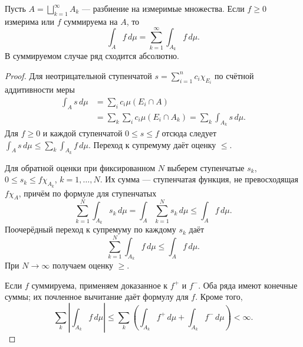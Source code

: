 \label{ticket:29}

\begin{theorem}
Пусть $A=\bigsqcup_{k=1}^{\infty}A_k$ --- разбиение на измеримые множества.
Если $f\ge0$ измерима или $f$ суммируема на $A$, то
\[
  \int_A f\,d\mu=\sum_{k=1}^{\infty}\int_{A_k}f\,d\mu.
\]
В суммируемом случае ряд сходится абсолютно.
\end{theorem}

\begin{proof}
Для неотрицательной ступенчатой $s=\sum_{i=1}^n c_i\chi_{E_i}$ по счётной аддитивности меры
\[
  \begin{aligned}
  \int_A s\,d\mu
   &=\sum_i c_i\mu(E_i\cap A)\\
   &=\sum_k\sum_i c_i\mu(E_i\cap A_k)
    =\sum_k\int_{A_k}s\,d\mu.
  \end{aligned}
\]
Для $f\ge0$ и каждой ступенчатой $0\le s\le f$ отсюда следует $\int_A s\,d\mu\le\sum_k\int_{A_k}f\,d\mu$.
Переход к супремуму даёт оценку $\le$.

Для обратной оценки при фиксированном $N$ выберем ступенчатые $s_k$, $0\le s_k\le f\chi_{A_k}$, $k=1,\ldots,N$.
Их сумма --- ступенчатая функция, не превосходящая $f\chi_A$, причём по формуле для ступенчатых
\[
  \sum_{k=1}^N\int_{A_k}s_k\,d\mu
  =\int_A\sum_{k=1}^N s_k\,d\mu\le\int_A f\,d\mu.
\]
Поочерёдный переход к супремуму по каждому $s_k$ даёт
\[
  \sum_{k=1}^N\int_{A_k}f\,d\mu\le\int_A f\,d\mu.
\]
При $N\to\infty$ получаем оценку $\ge$.

Если $f$ суммируема, применяем доказанное к $f^+$ и $f^-$.
Оба ряда имеют конечные суммы; их почленное вычитание даёт формулу для $f$.
Кроме того,
\[
  \sum_k\left|\int_{A_k}f\,d\mu\right|
  \le\sum_k\left(\int_{A_k}f^+\,d\mu+\int_{A_k}f^-\,d\mu\right)<\infty.
\]
\end{proof}
